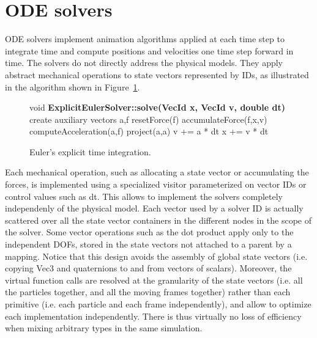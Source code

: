 \section{ODE solvers} 

ODE solvers implement animation algorithms applied at each time step to integrate time and compute positions and velocities one time step forward in time.
The solvers do not directly address the physical models. 
They apply abstract mechanical operations to state vectors represented by IDs, as illustrated in the algorithm shown in Figure~\ref{fig:eulerexplicit}.
\begin{figure}
\begin{center}
\begin{algorithmic}
\STATE void  \textbf{ExplicitEulerSolver::solve(VecId x, VecId v, double dt)}
\STATE create auxiliary vectors a,f
\STATE resetForce(f)
\STATE accumulateForce(f,x,v)
\STATE computeAcceleration(a,f)
\STATE project(a,a)
\STATE v += a * dt
\STATE x += v * dt
\end{algorithmic}
\caption{Euler's explicit time integration.}
\label{fig:eulerexplicit}
\end{center}
\end{figure}
Each mechanical operation, such as allocating a state vector or accumulating the forces, is implemented using a specialized visitor parameterized on vector IDs or control values such as dt.
This allows to implement the solvers completely independenly of the physical model.
Each vector used by a solver ID is actually scattered over all the state vector containers in the different nodes in the scope of the solver.
Some vector operations such as the dot product apply only to the independent DOFs, stored in the state vectors not attached to a parent by a mapping.
Notice that this design avoids the assembly of global state vectors (i.e. copying Vec3 and quaternions to and from  vectors of scalars).
Moreover, the virtual function calls are resolved at the granularity of the state vectors (i.e. all the particles together, and all the moving frames together) rather than each primitive (i.e. each particle and each frame independently), and allow to optimize each implementation independently.
There is thus virtually no loss of efficiency when mixing arbitrary types in the same simulation.




